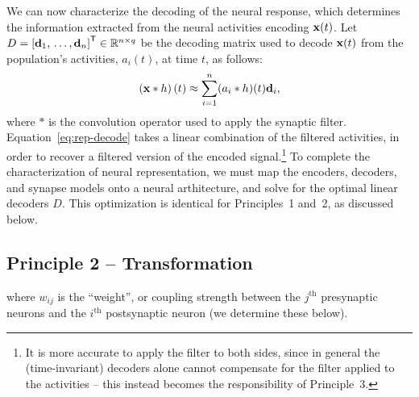 We can now characterize the decoding of the neural response, which determines the information extracted from the neural activities encoding $\mathbf{x}(t)$.
Let $D = {\left[ \mathbf{d}_1\text{,}\, \ldots\text{,}\, \mathbf{d}_n \right]}^\mathsf{T} \in \mathbb{R}^{n \times q}$ be the decoding matrix used to decode $\mathbf{x}(t)$ from the population's activities, $a_i(t)$, at time $t$, as follows:
\begin{equation} \label{eq:rep-decode}
\left(\mathbf{x} \ast h \right)(t) \approx \sum_{i=1}^n (a_i \ast h)(t) \mathbf{d}_i \text{,}
\end{equation}
where $\ast$ is the convolution operator used to apply the synaptic filter.
Equation~\ref{eq:rep-decode} takes a linear combination of the filtered activities, in order to recover a filtered version of the encoded signal.\footnote{It is more accurate to apply the filter to both sides, since in general the (time-invariant) decoders alone cannot compensate for the filter applied to the activities -- this instead becomes the responsibility of Principle~3.}
To complete the characterization of neural representation, we must map the encoders, decoders, and synapse models onto a neural arthitecture, and solve for the optimal linear decoders $D$.
This optimization is identical for Principles~1 and~2, as discussed below.

\subsection{Principle 2 -- Transformation}
\label{sec:principle2}

where $w_{ij}$ is the ``weight'', or coupling strength between the $j^\text{th}$ presynaptic neurons and the $i^\text{th}$ postsynaptic neuron (we determine these below).

